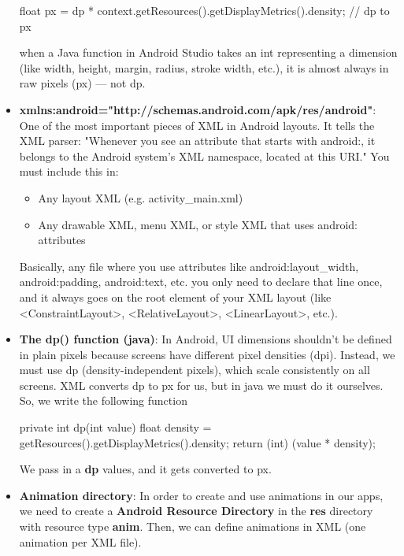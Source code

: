 \documentclass{report}
\begin{document}
\begin{itemize}
\begin{javacode}
                float px = dp * context.getResources().getDisplayMetrics().density; // dp to px
            \end{javacode}
            \bigbreak \noindent 
            when a Java function in Android Studio takes an int representing a dimension (like width, height, margin, radius, stroke width, etc.), it is almost always in raw pixels (px) — not dp.
        \item \textbf{xmlns:android="http://schemas.android.com/apk/res/android"}: One of the most important pieces of XML in Android layouts.
            \bigbreak \noindent 
            It tells the XML parser: "Whenever you see an attribute that starts with android:, it belongs to the Android system’s XML namespace, located at this URI."
            \bigbreak \noindent 
            You must include this in:
            \begin{itemize}
                \item Any layout XML (e.g. activity\_main.xml)
                \item Any drawable XML, menu XML, or style XML that uses android: attributes
            \end{itemize}
            Basically, any file where you use attributes like android:layout\_width, android:padding, android:text, etc.
            \bigbreak \noindent 
            you only need to declare that line once, and it always goes on the root element of your XML layout (like <ConstraintLayout>, <RelativeLayout>, <LinearLayout>, etc.).
        \item \textbf{The dp() function (java)}: In Android, UI dimensions shouldn’t be defined in plain pixels because screens have different pixel densities (dpi). Instead, we must use dp (density-independent pixels), which scale consistently on all screens.
            \bigbreak \noindent 
            XML converts dp to px for us, but in java we must do it ourselves. So, we write the following function
            \bigbreak \noindent 
            \begin{javacode}
                private int dp(int value) {
                    float density = getResources().getDisplayMetrics().density;
                    return (int) (value * density);
                } 
            \end{javacode}
            \bigbreak \noindent 
            We pass in a \textbf{dp} values, and it gets converted to px.
        \item \textbf{Animation directory}: In order to create and use animations in our apps, we need to create a \textbf{Android Resource Directory} in the \textbf{res} directory with resource type \textbf{anim}. Then, we can define animations in XML (one animation per XML file).

\end{itemize}
\end{document}

